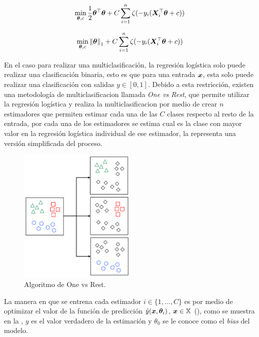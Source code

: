 \begin{equation} \label{eq:ovr-reg-l2costfunc}
  \min_{{\bm{\theta}}, c} \frac{1}{2}{\bm{\theta}}^{\top} {\bm{\theta}} + C \sum_{i=1}^n \zeta(- y_i ({\bm{X}}_i^{\top} {\bm{\theta}} + c))
\end{equation}

\begin{equation} \label{eq:ovr-reg-l1costfunc}
  \min_{{\bm{\theta}}, c} \left\lVert{\bm{\theta}}\right\rVert_1 + C \sum_{i=1}^n \zeta(- y_i ({\bm{X}}_i^{\top} {\bm{\theta}} + c))
\end{equation}

En el caso para realizar una multiclasificaci\'on, la regresión logística solo puede realizar una clasificación binaria, esto es que para una entrada ${\bm{x}}$, esta solo puede realizar una clasificación con salidas $y \in [0, 1]$. Debido a esta restricción, existen una metodología de multiclasificacion llamada \emph{One vs Rest}, que permite utilizar la regresión logística y realiza la multiclasificacion por medio de crear $n$ estimadores que permiten estimar cada una de las $C$ clases respecto al resto de la entrada, por cada una de los estimadores se estima cual es la clase con mayor valor en la regresión logística individual de ese estimador, la  representa una versión simplificada del proceso.

\begin{figure}[H]
  \centering
  \includegraphics[width=0.5\textwidth]{Figures/one-vs-rest.pdf}
\decoRule
\caption[Algoritmo de One vs Rest]{Algoritmo de One vs Rest.}
\label{fig:ovr-algo}
\end{figure}

La manera en que se entrena cada estimador $i \in \{1, \ldots, C\}$ es por medio de optimizar el valor de la función de predicción $\hat{y}({\bm{x}}, {\bm{\theta}}_i)$, ${\bm{x}} \in {\mathbb{X}}$ (), como se muestra en la , $y$ es el valor verdadero de la estimación y $\theta_0$ se le conoce como el \emph{bias} del modelo.

